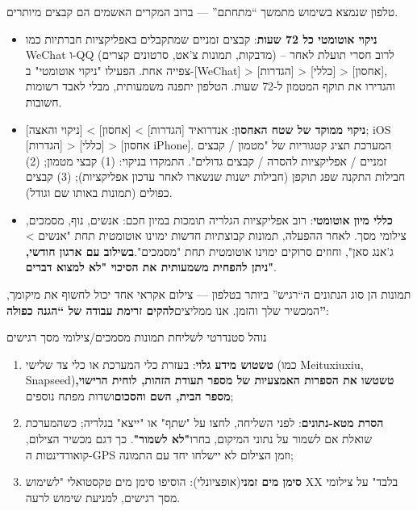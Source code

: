 
טלפון שנמצא בשימוש מתמשך “מתחתם” — ברוב המקרים האשמים הם קבצים מיותרים.

\begin{itemize}
  \item \textbf{ניקוי אוטומטי כל 72 שעות}: קבצים זמניים שמתקבלים באפליקציות חברתיות כמו WeChat ו-QQ (מדבקות, תמונות צ'אט, סרטונים קצרים) – לרוב חסרי תועלת לאחר צפייה אחת. הפעילו "ניקוי אוטומטי" ב-[WeChat] > [הגדרות] > [כללי] > [אחסון], והגדירו את תוקף המטמון ל-72 שעות. הטלפון יתפנה משמעותית, מבלי לאבד רשומות חשובות.
  \item \textbf{ניקוי ממוקד של שטח האחסון}: אנדרואיד [הגדרות] > [אחסון] > [ניקוי והאצה]; iOS [הגדרות] > [כללי] > [אחסון iPhone]. המערכת תציג קטגוריות של "מטמון / קבצים זמניים / אפליקציות להסרה / קבצים גדולים". התמקדו בניקוי: (1) קבצי מטמון; (2) חבילות התקנה שפג תוקפן (חבילות ישנות שנשארו לאחר עדכון אפליקציות); (3) קבצים כפולים (תמונות באותו שם וגודל).
  \item \textbf{כללי מיון אוטומטי}: רוב אפליקציות הגלריה תומכות במיון חכם: אנשים, נוף, מסמכים, צילומי מסך. לאחר ההפעלה, תמונות קבוצתיות חדשות ימוינו אוטומטית תחת "אנשים > ג'אנג סאן", וחוזים סרוקים ימוינו אוטומטית תחת "מסמכים".\textbf{בשילוב עם ארגון חודשי, ניתן להפחית משמעותית את הסיכוי "לא למצוא דברים"}.
\end{itemize}


תמונות הן סוג הנתונים ה“רגיש” ביותר בטלפון — צילום אקראי אחד יכול לחשוף את מיקומך, המכשיר שלך והזמן. אנו ממליצים\textbf{להקים זרימת עבודה של “הגנה כפולה”}:

\begin{tcbwarn}{נוהל סטנדרטי לשליחת תמונות מסמכים/צילומי מסך רגישים}
\begin{enumerate}
  \item \textbf{טשטוש מידע גלוי}: בעזרת כלי המערכת או כלי צד שלישי (כמו Meituxiuxiu, Snapseed)\textbf{טשטשו את הספרות האמצעיות של מספר תעודת הזהות, לוחית הרישוי, מספר הבית, השם והסכום}ושדות מפתח נוספים;
  \item \textbf{הסרת מטא-נתונים}: לפני השליחה, לחצו על "שתף" או "ייצא" בגלריה; כשהמערכת שואלת אם לשמור על נתוני המיקום, בחרו\textbf{"לא לשמור"}. כך דגם מכשיר הצילום, קואורדינטות ה-GPS וזמן הצילום לא יישלחו יחד עם התמונה;
  \item \textbf{סימן מים זמני}(אופציונלי): הוסיפו סימן מים טקסטואלי "לשימוש XX בלבד" על צילומי מסך רגישים, למניעת שימוש לרעה.
\end{enumerate}

\end{tcbwarn}

